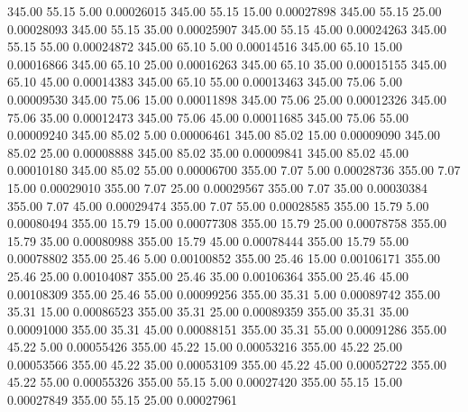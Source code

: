     345.00     55.15      5.00     0.00026015
    345.00     55.15     15.00     0.00027898
    345.00     55.15     25.00     0.00028093
    345.00     55.15     35.00     0.00025907
    345.00     55.15     45.00     0.00024263
    345.00     55.15     55.00     0.00024872
    345.00     65.10      5.00     0.00014516
    345.00     65.10     15.00     0.00016866
    345.00     65.10     25.00     0.00016263
    345.00     65.10     35.00     0.00015155
    345.00     65.10     45.00     0.00014383
    345.00     65.10     55.00     0.00013463
    345.00     75.06      5.00     0.00009530
    345.00     75.06     15.00     0.00011898
    345.00     75.06     25.00     0.00012326
    345.00     75.06     35.00     0.00012473
    345.00     75.06     45.00     0.00011685
    345.00     75.06     55.00     0.00009240
    345.00     85.02      5.00     0.00006461
    345.00     85.02     15.00     0.00009090
    345.00     85.02     25.00     0.00008888
    345.00     85.02     35.00     0.00009841
    345.00     85.02     45.00     0.00010180
    345.00     85.02     55.00     0.00006700
    355.00      7.07      5.00     0.00028736
    355.00      7.07     15.00     0.00029010
    355.00      7.07     25.00     0.00029567
    355.00      7.07     35.00     0.00030384
    355.00      7.07     45.00     0.00029474
    355.00      7.07     55.00     0.00028585
    355.00     15.79      5.00     0.00080494
    355.00     15.79     15.00     0.00077308
    355.00     15.79     25.00     0.00078758
    355.00     15.79     35.00     0.00080988
    355.00     15.79     45.00     0.00078444
    355.00     15.79     55.00     0.00078802
    355.00     25.46      5.00     0.00100852
    355.00     25.46     15.00     0.00106171
    355.00     25.46     25.00     0.00104087
    355.00     25.46     35.00     0.00106364
    355.00     25.46     45.00     0.00108309
    355.00     25.46     55.00     0.00099256
    355.00     35.31      5.00     0.00089742
    355.00     35.31     15.00     0.00086523
    355.00     35.31     25.00     0.00089359
    355.00     35.31     35.00     0.00091000
    355.00     35.31     45.00     0.00088151
    355.00     35.31     55.00     0.00091286
    355.00     45.22      5.00     0.00055426
    355.00     45.22     15.00     0.00053216
    355.00     45.22     25.00     0.00053566
    355.00     45.22     35.00     0.00053109
    355.00     45.22     45.00     0.00052722
    355.00     45.22     55.00     0.00055326
    355.00     55.15      5.00     0.00027420
    355.00     55.15     15.00     0.00027849
    355.00     55.15     25.00     0.00027961
